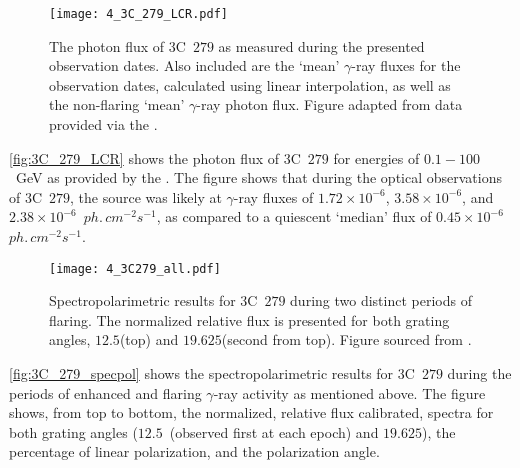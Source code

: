 \begin{figure}[t]
    \centering
    \texttt{[image: 4\_3C\_279\_LCR.pdf]}
    \caption{The photon flux of 3C~$279$ as measured during the presented observation dates. Also included are the `mean' $\gamma$-ray fluxes for the observation dates, calculated using linear interpolation, as well as the non-flaring `mean' $\gamma$-ray photon flux. Figure adapted from data provided via the .\protect\footnotemark}
    \label{fig:3C_279_LCR}
\end{figure}

\autoref{fig:3C_279_LCR} shows the photon flux of 3C~$279$ for energies of $0.1 - 100$~GeV as provided by the  \citep{FermiLCR}.
The figure shows that during the optical observations of 3C~$279$, the source was likely at $\gamma$-ray fluxes of $1.72 \times 10^{-6}$, $3.58 \times 10^{-6}$, and $2.38 \times 10^{-6}$~$ph.\,cm^{-2}s^{-1}$, as compared to a quiescent `median' flux of $0.45 \times 10^{-6}$~$ph.\,cm^{-2}s^{-1}$.

\begin{figure}[t]
    \centering
    \texttt{[image: 4\_3C279\_all.pdf]}
    \caption{Spectropolarimetric results for 3C~$279$ during two distinct periods of flaring. The normalized relative flux is presented for both grating angles, $12.5$\degree (top) and $19.625$\degree (second from top). Figure sourced from \citep{Cooper_HEASA2022}.}
    \label{fig:3C_279_specpol}
\end{figure}

\autoref{fig:3C_279_specpol} shows the spectropolarimetric results for 3C~$279$ during the periods of enhanced and flaring $\gamma$-ray activity as mentioned above.
The figure shows, from top to bottom, the normalized, relative flux calibrated, spectra for both grating angles ($12.5$\degree\ (observed first at each epoch) and $19.625$\degree), the percentage of linear polarization, and the polarization angle.

